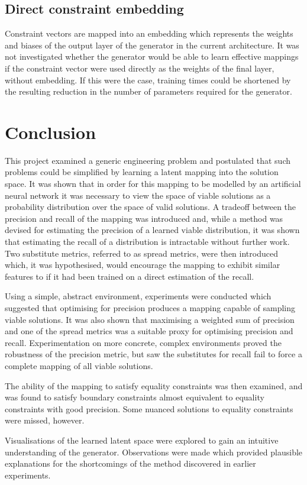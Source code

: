 \documentclass[../../main.tex]{subfiles}
\begin{document}
\subsection{Direct constraint embedding} \label{subsection:directConstraintEmbedding}

Constraint vectors are mapped into an embedding which represents the weights and biases of the output layer of the generator in the current architecture.
It was not investigated whether the generator would be able to learn effective mappings if the constraint vector were used directly as the weights of the final layer, without embedding.
If this were the case, training times could be shortened by the resulting reduction in the number of parameters required for the generator.

\section{Conclusion} \label{section:conclusion}

This project examined a generic engineering problem and postulated that such problems could be simplified by learning a latent mapping into the solution space.
It was shown that in order for this mapping to be modelled by an artificial neural network it was necessary to view the space of viable solutions as a probability distribution over the space of valid solutions.
A tradeoff between the precision and recall of the mapping was introduced and, while a method was devised for estimating the precision of a learned viable distribution, it was shown that estimating the recall of a distribution is intractable without further work.
Two substitute metrics, referred to as spread metrics, were then introduced which, it was hypothesised, would encourage the mapping to exhibit similar features to if it had been trained on a direct estimation of the recall.

Using a simple, abstract environment, experiments were conducted which suggested that optimising for precision produces a mapping capable of sampling viable solutions.
It was also shown that maximising a weighted sum of precision and one of the spread metrics was a suitable proxy for optimising precision and recall.
Experimentation on more concrete, complex environments proved the robustness of the precision metric, but saw the substitutes for recall fail to force a complete mapping of all viable solutions.

The ability of the mapping to satisfy equality constraints was then examined, and was found to satisfy boundary constraints almost equivalent to equality constraints with good precision.
Some nuanced solutions to equality constraints were missed, however.

Visualisations of the learned latent space were explored to gain an intuitive understanding of the generator.
Observations were made which provided plausible explanations for the shortcomings of the method discovered in earlier experiments.
\end{document}
